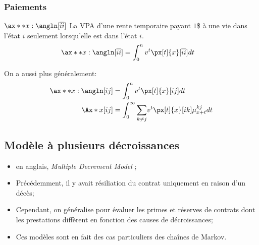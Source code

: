 \documentclass[10pt, french]{article}
\begin{document}
\begin{multicols*}{2}
\subsubsection*{Paiements}
\begin{description}
	\item	$\ax**{x:\angln}[\overline{ii}]$	La VPA d'une rente temporaire payant $1$\$ à une vie dans l'état $i$ seulement lorsqu'elle est dans l'état $i$.
		\begin{align*}
		\ax**{x:\angln}[\overline{ii}]
		&=	\int_{0}^{n} v^{t} \px[t]{x}[\overline{ii}] dt
		\end{align*}
	\item	On a aussi plus généralement:
\begin{align*}
	\ax**{x:\angln}[ij]
	&=	\int_{0}^{n} v^{t} \px[t]{x}[ij] dt	\\
	\Ax*{x}[ij]
	&=	\int_{0}^{\infty} \sumz{}{k \neq j}	v^{t} \px[t]{x}[ik] \mu_{x + t}^{kj} dt
\end{align*}
\end{description}




\subsection*{Modèle à plusieurs décroissances}
\begin{itemize}[leftmargin = *]
	\item	en anglais, \og \textit{Multiple Decrement Model} \fg{};
	\item	Précédemment, il y avait résiliation du contrat uniquement en raison d'un décès;
	\item	Cependant, on généralise pour évaluer les primes et réserves de contrats dont les prestations diffèrent en fonction des causes de décroissances;
	\item	Ces modèles sont en fait des cas particuliers des chaînes de Markov.
\end{itemize}


\end{multicols*}
\end{document}
